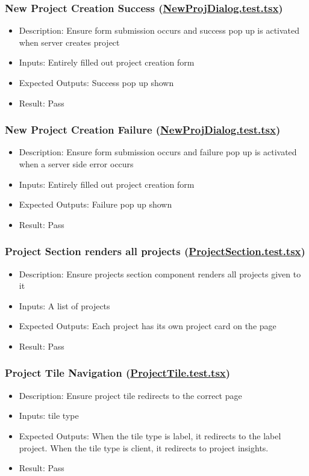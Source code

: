 \documentclass[12pt, titlepage]{article}
\begin{document}
\subsubsection{New Project Creation Success (\href{https://github.com/OKKM-insights/frontend/blob/main/tests/__tests__/NewProjDialog.test.tsx}{NewProjDialog.test.tsx})}
\begin{itemize}
    \item Description: Ensure form submission occurs and success pop up is activated when server creates project
    \item Inputs: Entirely filled out project creation form
    \item Expected Outputs: Success pop up shown
    \item Result: Pass
\end{itemize}
\subsubsection{New Project Creation Failure (\href{https://github.com/OKKM-insights/frontend/blob/main/tests/__tests__/NewProjDialog.test.tsx}{NewProjDialog.test.tsx})}
\begin{itemize}
    \item Description: Ensure form submission occurs and failure pop up is activated when a server side error occurs
    \item Inputs: Entirely filled out project creation form
    \item Expected Outputs: Failure pop up shown
    \item Result: Pass
\end{itemize}
\subsubsection{Project Section renders all projects (\href{https://github.com/OKKM-insights/frontend/blob/main/tests/__tests__/ProjectSection.test.tsx}{ProjectSection.test.tsx})}
\begin{itemize}
    \item Description: Ensure projects section component renders all projects given to it
    \item Inputs: A list of projects
    \item Expected Outputs: Each project has its own project card on the page
    \item Result: Pass
\end{itemize}
\subsubsection{Project Tile Navigation (\href{https://github.com/OKKM-insights/frontend/blob/main/tests/__tests__/ProjectTile.test.tsx}{ProjectTile.test.tsx})}
\begin{itemize}
    \item Description: Ensure project tile redirects to the correct page
    \item Inputs: tile type
    \item Expected Outputs: When the tile type is label, it redirects to the label project. When the tile type is client, it redirects to project insights.
    \item Result: Pass
\end{itemize}
\end{document}
